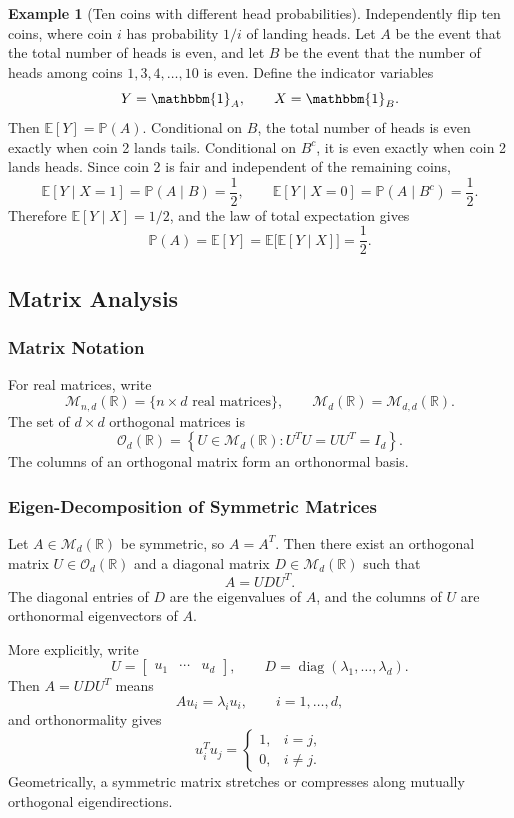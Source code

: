 \documentclass[12pt,oneside]{book}
\numberwithin{equation}{section}
\theoremstyle{definition}
\newtheorem{example}{Example}[section]
\theoremstyle{plain}
\theoremstyle{remark}
\newcommand{\R}{\mathbb{R}}
\newcommand{\E}{\mathbb{E}}
\newcommand{\ind}{\mathbbm{1}}
\newcommand{\diag}{\operatorname{diag}}
\begin{document}
\begin{example}[Ten coins with different head probabilities]
Independently flip ten coins, where coin $i$ has probability $1/i$ of landing heads. Let $A$ be the event that the total number of heads is even, and let $B$ be the event that the number of heads among coins $1,3,4,\ldots,10$ is even. Define the indicator variables
\[
Y=\ind_A,
\qquad
X=\ind_B.
\]
Then $\E[Y]=\mathbb{P}(A)$. Conditional on $B$, the total number of heads is even exactly when coin 2 lands tails. Conditional on $B^c$, it is even exactly when coin 2 lands heads. Since coin 2 is fair and independent of the remaining coins,
\[
\E[Y\mid X=1]=\mathbb{P}(A\mid B)=\frac{1}{2},
\qquad
\E[Y\mid X=0]=\mathbb{P}(A\mid B^c)=\frac{1}{2}.
\]
Therefore $\E[Y\mid X]=1/2$, and the law of total expectation gives
\[
\mathbb{P}(A)=\E[Y]
=\E\bigl[\E[Y\mid X]\bigr]
=\frac{1}{2}.
\]
\end{example}

\subsection{Matrix Analysis}

\subsubsection{Matrix Notation}
For real matrices, write
\[
\mathcal{M}_{n,d}(\R)
=\{n\times d\text{ real matrices}\},
\qquad
\mathcal{M}_d(\R)=\mathcal{M}_{d,d}(\R).
\]
The set of $d\times d$ orthogonal matrices is
\[
\mathcal{O}_d(\R)
=\left\{U\in\mathcal{M}_d(\R):
U^TU=UU^T=I_d\right\}.
\]
The columns of an orthogonal matrix form an orthonormal basis.

\subsubsection{Eigen-Decomposition of Symmetric Matrices}
Let $A\in\mathcal{M}_d(\R)$ be symmetric, so $A=A^T$. Then there exist an orthogonal matrix $U\in\mathcal{O}_d(\R)$ and a diagonal matrix $D\in\mathcal{M}_d(\R)$ such that
\[
A=UDU^T.
\]
The diagonal entries of $D$ are the eigenvalues of $A$, and the columns of $U$ are orthonormal eigenvectors of $A$.

More explicitly, write
\[
U=\begin{bmatrix}u_1&\cdots&u_d\end{bmatrix},
\qquad
D=\diag(\lambda_1,\ldots,\lambda_d).
\]
Then $A=UDU^T$ means
\[
Au_i=\lambda_i u_i,
\qquad i=1,\ldots,d,
\]
and orthonormality gives
\[
u_i^Tu_j=
\begin{cases}
1, & i=j,\\
0, & i\neq j.
\end{cases}
\]
Geometrically, a symmetric matrix stretches or compresses along mutually orthogonal eigendirections.
\end{document}
